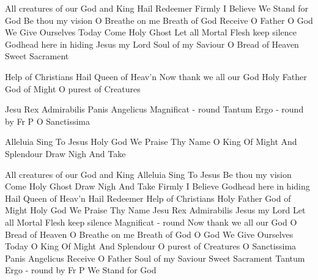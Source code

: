 
All creatures of our God and King
Hail Redeemer
Firmly I Believe
We Stand for God
Be thou my vision
O Breathe on me Breath of God
Receive O Father
O God We Give Ourselves Today
Come Holy Ghost
Let all Mortal Flesh keep silence
Godhead here in hiding
Jesus my Lord
Soul of my Saviour
O Bread of Heaven
Sweet Sacrament

Help of Christians
Hail Queen of Heav'n
Now thank we all our God
Holy Father God of Might
O purest of Creatures


Jesu Rex Admirabilis
Panis Angelicus
Magnificat - round
Tantum Ergo - round by Fr P
O Sanctissima

Alleluia Sing To Jesus
Holy God We Praise Thy Name
O King Of Might And Splendour 
Draw Nigh And Take

All creatures of our God and King
Alleluia Sing To Jesus
Be thou my vision
Come Holy Ghost
Draw Nigh And Take
Firmly I Believe
Godhead here in hiding
Hail Queen of Heav'n
Hail Redeemer
Help of Christians
Holy Father God of Might
Holy God We Praise Thy Name
Jesu Rex Admirabilis
Jesus my Lord
Let all Mortal Flesh keep silence
Magnificat - round
Now thank we all our God
O Bread of Heaven
O Breathe on me Breath of God
O God We Give Ourselves Today
O King Of Might And Splendour 
O purest of Creatures
O Sanctissima
Panis Angelicus
Receive O Father
Soul of my Saviour
Sweet Sacrament
Tantum Ergo - round by Fr P
We Stand for God
